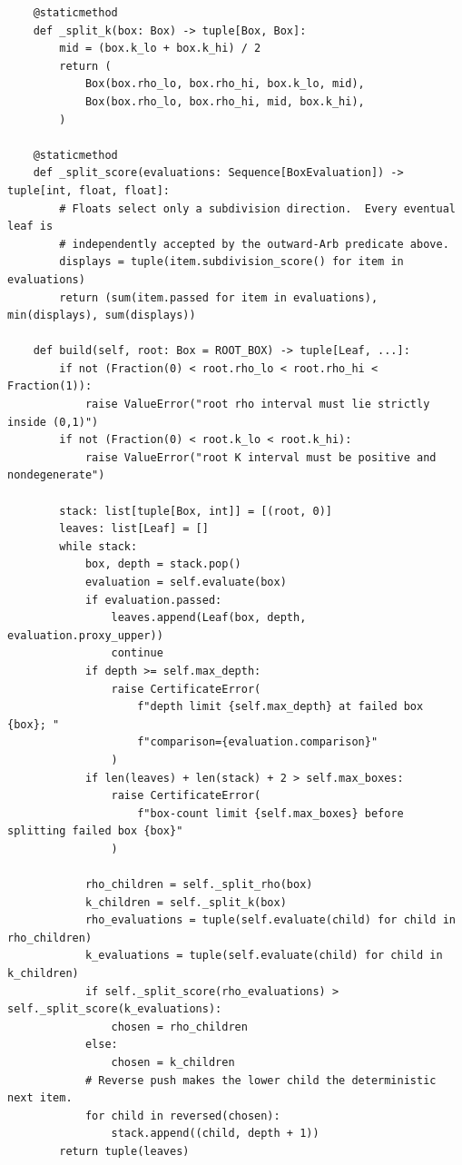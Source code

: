 \documentclass[11pt]{article}
\numberwithin{equation}{section}
\theoremstyle{definition}
\theoremstyle{remark}
\begin{document}
\begin{lstlisting}
    @staticmethod
    def _split_k(box: Box) -> tuple[Box, Box]:
        mid = (box.k_lo + box.k_hi) / 2
        return (
            Box(box.rho_lo, box.rho_hi, box.k_lo, mid),
            Box(box.rho_lo, box.rho_hi, mid, box.k_hi),
        )

    @staticmethod
    def _split_score(evaluations: Sequence[BoxEvaluation]) -> tuple[int, float, float]:
        # Floats select only a subdivision direction.  Every eventual leaf is
        # independently accepted by the outward-Arb predicate above.
        displays = tuple(item.subdivision_score() for item in evaluations)
        return (sum(item.passed for item in evaluations), min(displays), sum(displays))

    def build(self, root: Box = ROOT_BOX) -> tuple[Leaf, ...]:
        if not (Fraction(0) < root.rho_lo < root.rho_hi < Fraction(1)):
            raise ValueError("root rho interval must lie strictly inside (0,1)")
        if not (Fraction(0) < root.k_lo < root.k_hi):
            raise ValueError("root K interval must be positive and nondegenerate")

        stack: list[tuple[Box, int]] = [(root, 0)]
        leaves: list[Leaf] = []
        while stack:
            box, depth = stack.pop()
            evaluation = self.evaluate(box)
            if evaluation.passed:
                leaves.append(Leaf(box, depth, evaluation.proxy_upper))
                continue
            if depth >= self.max_depth:
                raise CertificateError(
                    f"depth limit {self.max_depth} at failed box {box}; "
                    f"comparison={evaluation.comparison}"
                )
            if len(leaves) + len(stack) + 2 > self.max_boxes:
                raise CertificateError(
                    f"box-count limit {self.max_boxes} before splitting failed box {box}"
                )

            rho_children = self._split_rho(box)
            k_children = self._split_k(box)
            rho_evaluations = tuple(self.evaluate(child) for child in rho_children)
            k_evaluations = tuple(self.evaluate(child) for child in k_children)
            if self._split_score(rho_evaluations) > self._split_score(k_evaluations):
                chosen = rho_children
            else:
                chosen = k_children
            # Reverse push makes the lower child the deterministic next item.
            for child in reversed(chosen):
                stack.append((child, depth + 1))
        return tuple(leaves)


\end{lstlisting}
\end{document}
